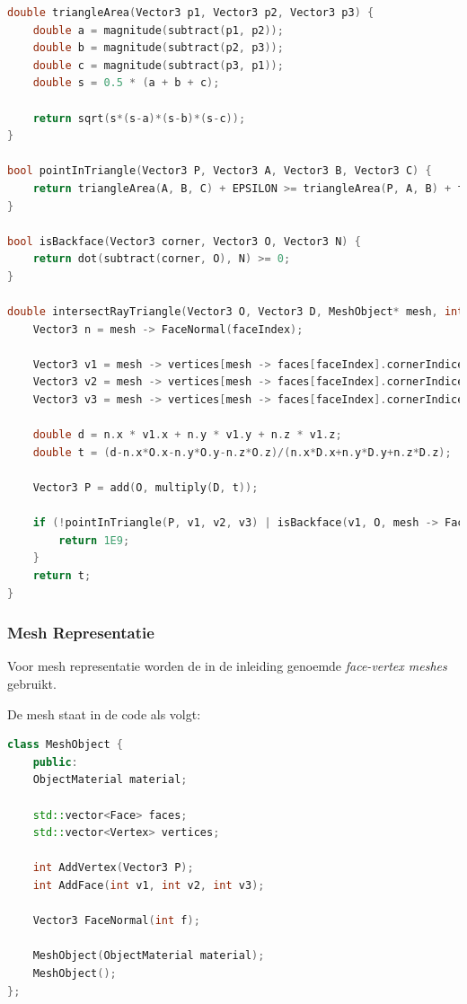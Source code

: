 \documentclass[12pt, a4paper]{article}
\begin{document}
\begin{lstlisting}[language=c++]
double triangleArea(Vector3 p1, Vector3 p2, Vector3 p3) {
	double a = magnitude(subtract(p1, p2));
	double b = magnitude(subtract(p2, p3));
	double c = magnitude(subtract(p3, p1));
	double s = 0.5 * (a + b + c);
	
	return sqrt(s*(s-a)*(s-b)*(s-c));
}

bool pointInTriangle(Vector3 P, Vector3 A, Vector3 B, Vector3 C) {
	return triangleArea(A, B, C) + EPSILON >= triangleArea(P, A, B) + triangleArea(P, A, C) + triangleArea(P, B, C);
}

bool isBackface(Vector3 corner, Vector3 O, Vector3 N) {
	return dot(subtract(corner, O), N) >= 0;
}

double intersectRayTriangle(Vector3 O, Vector3 D, MeshObject* mesh, int faceIndex) {
	Vector3 n = mesh -> FaceNormal(faceIndex);
	
	Vector3 v1 = mesh -> vertices[mesh -> faces[faceIndex].cornerIndices[0]].pos;
	Vector3 v2 = mesh -> vertices[mesh -> faces[faceIndex].cornerIndices[1]].pos;
	Vector3 v3 = mesh -> vertices[mesh -> faces[faceIndex].cornerIndices[2]].pos;
	
	double d = n.x * v1.x + n.y * v1.y + n.z * v1.z;
	double t = (d-n.x*O.x-n.y*O.y-n.z*O.z)/(n.x*D.x+n.y*D.y+n.z*D.z);
	
	Vector3 P = add(O, multiply(D, t));
	
	if (!pointInTriangle(P, v1, v2, v3) | isBackface(v1, O, mesh -> FaceNormal(faceIndex))) {
		return 1E9;
	}
	return t;
}
\end{lstlisting}

\subsubsection{Mesh Representatie}
Voor mesh representatie worden de in de inleiding genoemde \textit{face-vertex meshes} gebruikt. 

De mesh staat in de code als volgt:
\begin{lstlisting}[language=c++]
class MeshObject {
	public:
	ObjectMaterial material;
	
	std::vector<Face> faces;
	std::vector<Vertex> vertices;
	
	int AddVertex(Vector3 P);
	int AddFace(int v1, int v2, int v3);
	
	Vector3 FaceNormal(int f);
	
	MeshObject(ObjectMaterial material);
	MeshObject();
};
\end{lstlisting}
\end{document}
